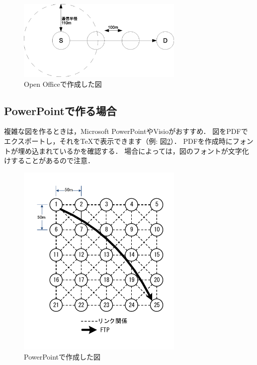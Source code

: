 \documentclass[submit,techreq,noauthor]{eco}	%
\begin{document}
\begin{figure}[t]
	\centering
	\includegraphics[width=8cm]{fig/ex1.eps}
	\caption{Open Officeで作成した図}
	\label{fig:tgif-sample}
\end{figure}

\subsection{PowerPointで作る場合}
複雑な図を作るときは，Microsoft PowerPointやVisioがおすすめ．
図をPDFでエクスポートし，それをTeXで表示できます（例: 図\ref{fig:pdf-sample}）．
PDFを作成時にフォントが埋め込まれているかを確認する．
場合によっては，図のフォントが文字化けすることがあるので注意．

\begin{figure}[t]
	\centering
	\includegraphics[width=8cm]{fig/ex2.pdf}
	\caption{PowerPointで作成した図}
	\label{fig:pdf-sample}
\end{figure}
\end{document}
